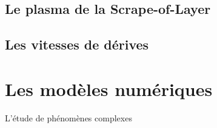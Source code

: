 		\subsection{Le plasma de la Scrape-of-Layer}
		\subsection{Les vitesses de dérives}
		\label{vitessesDerive}
	\section{Les modèles numériques}
		L'étude de phénomènes complexes
%


	
	

		